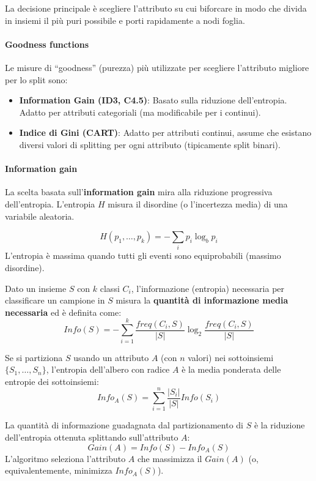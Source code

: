 La decisione principale è scegliere l'attributo su cui biforcare in modo che
divida in insiemi il più puri possibile e porti rapidamente a nodi foglia.

\paragraph{Goodness functions}

Le misure di ``goodness'' (purezza) più utilizzate per scegliere l'attributo
migliore per lo split sono:
\begin{itemize}
    \item \textbf{Information Gain (ID3, C4.5)}: Basato sulla riduzione
    dell'entropia. Adatto per attributi categoriali (ma modificabile per
    i continui).
    \item \textbf{Indice di Gini (CART)}: Adatto per attributi continui,
    assume che esistano diversi valori di splitting per ogni attributo
    (tipicamente split binari).
\end{itemize}

\paragraph{Information gain}

La scelta basata sull'\textbf{information gain} mira alla riduzione
progressiva dell'entropia.
L'entropia $H$ misura il disordine (o l'incertezza media) di una variabile
aleatoria.

\[
H(p_1, \ldots, p_k) = -\sum_{i}p_{i}\log_{b}p_{i}
\]
L'entropia è massima quando tutti gli eventi sono equiprobabili (massimo
disordine).

Dato un insieme $S$ con $k$ classi $C_i$, l'informazione (entropia)
necessaria per classificare un campione in $S$ misura la \textbf{quantità di
informazione media necessaria} ed è definita come:
\[
Info(S) = -\sum_{i=1}^{k}\frac{freq(C_{i},S)}{|S|}\log_{2}\frac{freq(C_{i},S)}{|S|}
\]

Se si partiziona $S$ usando un attributo $A$ (con $n$ valori) nei sottoinsiemi
$\{S_1, \ldots, S_n\}$, l'entropia dell'albero con radice $A$ è la media ponderata
delle entropie dei sottoinsiemi:
\[
Info_{A}(S) = \sum_{i=1}^{n}\frac{|S_{i}|}{|S|}Info(S_{i})
\]

La quantità di informazione guadagnata dal partizionamento di $S$
è la riduzione dell'entropia ottenuta splittando sull'attributo $A$:
\[
Gain(A) = Info(S) - Info_{A}(S)
\]
L'algoritmo seleziona l'attributo $A$ che massimizza il
$Gain(A)$ (o, equivalentemente, minimizza $Info_A(S)$).

